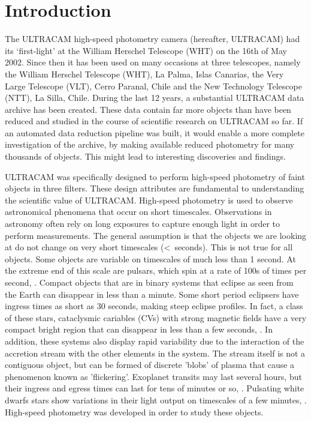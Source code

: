 \section{Introduction} 

The ULTRACAM high-speed photometry camera (hereafter, ULTRACAM) had its `first-light' at the William Herschel Telescope (WHT) on the 16th of May 2002. Since then it has been used on many occasions at three telescopes, namely the William Herschel Telescope (WHT), La Palma, Islas Canarias, the Very Large Telescope (VLT), Cerro Paranal, Chile and the New Technology Telescope (NTT), La Silla, Chile. During the last 12 years, a substantial ULTRACAM data archive has been created. These data contain far more objects than have been reduced  and studied in the course of scientific research on ULTRACAM so far. If an automated data reduction pipeline was built, it would enable a more complete investigation of the archive, by making available reduced photometry for many thousands of objects. This might lead to interesting discoveries and findings. 

ULTRACAM was specifically designed to perform high-speed photometry of faint objects in three filters. These design attributes are fundamental to understanding the scientific value of ULTRACAM.  High-speed photometry is used to observe astronomical phenomena that occur on short timescales. Observations in astronomy often rely on long exposures to capture enough light in order to perform measurements. The general assumption is that the objects we are looking at do not change on very short timescales (\textless~seconds). This is not true for all objects. Some objects are variable on timescales of much less than 1 second. At the extreme end of this scale are pulsars, which spin at a rate of 100s of times per second, \citep{pulsarreview}. Compact objects that are in binary systems that eclipse as seen from the Earth can disappear in less than a minute. Some short period eclipsers have ingress times as short as 30 seconds, making steep eclipse profiles. In fact, a class of these stars, cataclysmic cariables (CVs) with strong magnetic fields have a very compact bright region that can disappear in less than a few seconds, \citep{WarnerBook}. In addition, these systems also display rapid variability due to the interaction of the accretion stream with the other elements in the system. The stream itself is not a contiguous object, but can be formed of discrete 'blobs' of plasma that cause a phenomenon known as 'flickering'. Exoplanet transits may last several hours, but their ingress and egress times can last for tens of minutes or so, \citep{exoplanettransits}. Pulsating white dwarfs stars show variations in their light output on timescales of a few minutes, \citep{wingetreview}.  High-speed photometry was developed in order to study these objects. 

